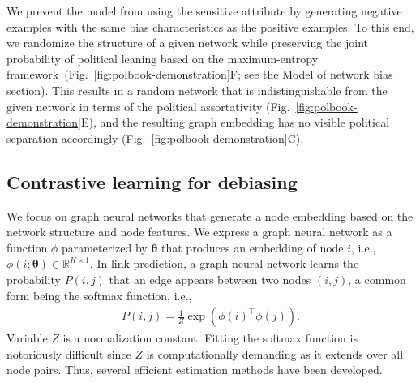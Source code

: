\documentclass{article}
\theoremstyle{plain}
\theoremstyle{definition}
\theoremstyle{remark}
\def\vec#1{{\bm #1}}
\def\vec#1{{\bm #1}}
\begin{document}
We prevent the model from using the sensitive attribute by generating negative examples with the same bias characteristics as the positive examples.
To this end, we randomize the structure of a given network while preserving the joint probability of political leaning based on the maximum-entropy framework~(Fig.~\ref{fig:polbook-demonstration}F; see the Model of network bias section). 
This results in a random network that is indistinguishable from the given network in terms of the political assortativity (Fig.~\ref{fig:polbook-demonstration}E), and the resulting graph embedding has no visible political separation accordingly (Fig.~\ref{fig:polbook-demonstration}C).
%
%

\subsection{Contrastive learning for debiasing}

We focus on graph neural networks that generate a node embedding based on the network structure and node features. 
We express a graph neural network as a function $\phi$ parameterized by $\vec{\theta}$ that produces an embedding of node $i$, i.e., $\phi(i;\vec{\theta}) \in {\mathbb R}^{K\times 1}$.
In link prediction, a graph neural network learns the probability $P(i,j)$ that an edge appears between two nodes $(i,j)$, a common form being the softmax function, i.e.,  
\begin{align}
    P(i,j) = \frac{1}{Z} \exp(\phi(i)^\top \phi(j)).
    \label{eq:graph_neural_net}
\end{align}
Variable $Z$ is a normalization constant. Fitting the softmax function is notoriously difficult since $Z$ is computationally demanding as it extends over all node pairs. Thus, several efficient estimation methods have been developed.
\end{document}
